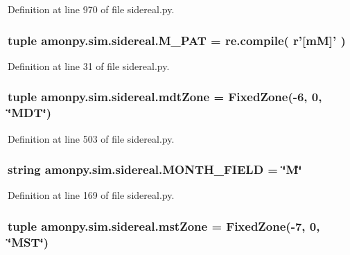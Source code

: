 Definition at line 970 of file sidereal.\-py.

\hypertarget{namespaceamonpy_1_1sim_1_1sidereal_a804824ee40100f10c0df7c2a78d7c557}{
\subsubsection[{M\-\_\-\-P\-A\-T}]{\setlength{\rightskip}{0pt plus 5cm}tuple amonpy.\-sim.\-sidereal.\-M\-\_\-\-P\-A\-T = re.\-compile( r'\mbox{[}m\-M\mbox{]}' )}}\label{namespaceamonpy_1_1sim_1_1sidereal_a804824ee40100f10c0df7c2a78d7c557}


Definition at line 31 of file sidereal.\-py.

\hypertarget{namespaceamonpy_1_1sim_1_1sidereal_a915285c8ea23cc18702c8c783c080355}{
\subsubsection[{mdt\-Zone}]{\setlength{\rightskip}{0pt plus 5cm}tuple amonpy.\-sim.\-sidereal.\-mdt\-Zone = {\bf Fixed\-Zone}(-\/6, 0, \char`\"{}M\-D\-T\char`\"{})}}\label{namespaceamonpy_1_1sim_1_1sidereal_a915285c8ea23cc18702c8c783c080355}


Definition at line 503 of file sidereal.\-py.

\hypertarget{namespaceamonpy_1_1sim_1_1sidereal_a24bbb70c569d2274730a610fd5380fee}{
\subsubsection[{M\-O\-N\-T\-H\-\_\-\-F\-I\-E\-L\-D}]{\setlength{\rightskip}{0pt plus 5cm}string amonpy.\-sim.\-sidereal.\-M\-O\-N\-T\-H\-\_\-\-F\-I\-E\-L\-D = \char`\"{}M\char`\"{}}}\label{namespaceamonpy_1_1sim_1_1sidereal_a24bbb70c569d2274730a610fd5380fee}


Definition at line 169 of file sidereal.\-py.

\hypertarget{namespaceamonpy_1_1sim_1_1sidereal_a34497c5b99af9d6762a3ca474aef4658}{
\subsubsection[{mst\-Zone}]{\setlength{\rightskip}{0pt plus 5cm}tuple amonpy.\-sim.\-sidereal.\-mst\-Zone = {\bf Fixed\-Zone}(-\/7, 0, \char`\"{}M\-S\-T\char`\"{})}}\label{namespaceamonpy_1_1sim_1_1sidereal_a34497c5b99af9d6762a3ca474aef4658}


